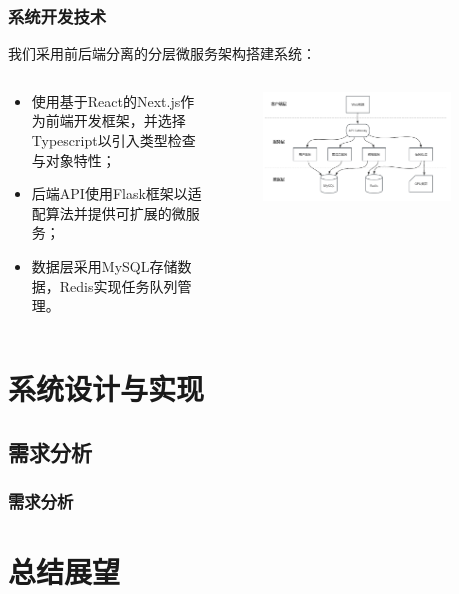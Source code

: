\documentclass[aspectratio=169]{ctexbeamer}
\begin{document}
\begin{frame}
  \frametitle{系统开发技术}
  我们采用前后端分离的分层微服务架构搭建系统：
  \begin{columns}
    \begin{column}{0.4\textwidth}
      \begin{itemize}
        \item 使用基于React的Next.js作为前端开发框架，并选择Typescript以引入类型检查与对象特性；
        \item 后端API使用Flask框架以适配算法并提供可扩展的微服务；
        \item 数据层采用MySQL存储数据，Redis实现任务队列管理。
      \end{itemize}
    \end{column}
    \begin{column}{0.6\textwidth}
      \begin{figure}
        \includegraphics[width=0.9\textwidth]{source/system_structure.png}
      \end{figure}
    \end{column}
  \end{columns}
\end{frame}

\section{系统设计与实现}
\subsection{需求分析}
\begin{frame}
  \frametitle{需求分析}
  
\end{frame}


\section{总结展望}
\end{document}
